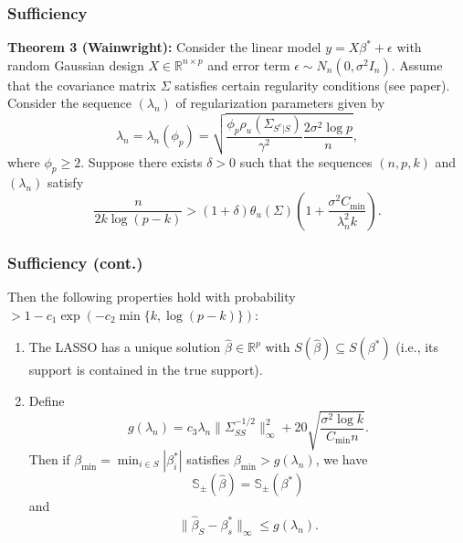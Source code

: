 \documentclass{beamer}
\newcommand{\norm}[1]{\lVert#1\rVert}
\begin{document}
\begin{frame}
\frametitle{Sufficiency}

\textbf{Theorem 3 (Wainwright):}
Consider the linear model $y = X\beta^\ast + \epsilon$ with random
Gaussian design $X \in \mathbb{R}^{n \times p}$ and error term
$\epsilon \sim N_n(0, \sigma^2 I_n)$. Assume that the covariance
matrix $\Sigma$ satisfies certain regularity conditions (see
paper). Consider the sequence $(\lambda_n)$ of regularization
parameters given by
\begin{equation*}
  \lambda_n = \lambda_n(\phi_p)
    = \sqrt{\frac{\phi_p \rho_u(\Sigma_{S^c|S})}{\gamma^2}
      \frac{2\sigma^2 \log p}{n}},
\end{equation*}
where $\phi_p \geq 2$. Suppose there exists $\delta > 0$ such that
the sequences $(n, p, k)$ and $(\lambda_n)$ satisfy
\begin{equation*}
  \frac{n}{2k \log (p - k)}
    > (1 + \delta) \theta_u(\Sigma)
      \left ( 1 + \frac{\sigma^2 C_{\mathrm{min}}}{\lambda_n^2 k}
      \right ).
\end{equation*}

\end{frame}

\begin{frame}
\frametitle{Sufficiency (cont.)}

Then the following properties hold with probability
$> 1 - c_1 \exp(-c_2 \min\{k, \log(p - k)\})$:
\begin{enumerate}
\item The LASSO has a unique solution $\hat{\beta} \in \mathbb{R}^p$
  with $S(\hat{\beta}) \subseteq S(\beta^\ast)$ (i.e., its support
  is contained in the true support).

\item Define
  \begin{equation*}
    g(\lambda_n) = c_3 \lambda_n \norm{\Sigma_{SS}^{-1/2}}_\infty^2
      + 20\sqrt{\frac{\sigma^2 \log k}{C_{\mathrm{min}} n}}.
  \end{equation*}
  Then if $\beta_{\mathrm{min}} = \min_{i \in S} |\beta^\ast_i|$
  satisfies $\beta_{\mathrm{min}} > g(\lambda_n)$, we have
  \begin{equation*}
    \mathbb{S}_\pm(\hat{\beta}) = \mathbb{S}_\pm(\beta^\ast)
  \end{equation*}
  and
  \begin{equation*}
    \norm{\hat{\beta}_S - \beta^\ast_s}_\infty \leq g(\lambda_n).
  \end{equation*}
\end{enumerate}

\end{frame}
\end{document}
